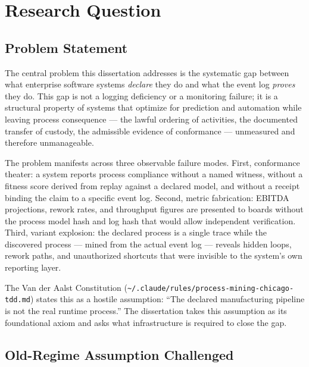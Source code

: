 
\section{Research Question}
\label{sec:phd-thesis-question}

\subsection{Problem Statement}
\label{sec:phd-thesis-question-problem}

The central problem this dissertation addresses is the systematic gap between what enterprise
software systems \emph{declare} they do and what the event log \emph{proves} they do. This gap
is not a logging deficiency or a monitoring failure; it is a structural property of systems that
optimize for prediction and automation while leaving process consequence --- the lawful ordering
of activities, the documented transfer of custody, the admissible evidence of conformance ---
unmeasured and therefore unmanageable.

The problem manifests across three observable failure modes. First, conformance theater: a
system reports process compliance without a named witness, without a fitness score derived from
replay against a declared model, and without a receipt binding the claim to a specific event log.
Second, metric fabrication: EBITDA projections, rework rates, and throughput figures are
presented to boards without the process model hash and log hash that would allow independent
verification. Third, variant explosion: the declared process is a single trace while the
discovered process --- mined from the actual event log --- reveals hidden loops, rework paths,
and unauthorized shortcuts that were invisible to the system's own reporting layer.

The Van der Aalst Constitution (\texttt{\textasciitilde/.claude/rules/process-mining-chicago-tdd.md})
states this as a hostile assumption: ``The declared manufacturing pipeline is not the real
runtime process.'' The dissertation takes this assumption as its foundational axiom and asks
what infrastructure is required to close the gap.

\subsection{Old-Regime Assumption Challenged}
\label{sec:phd-thesis-question-old-regime}

